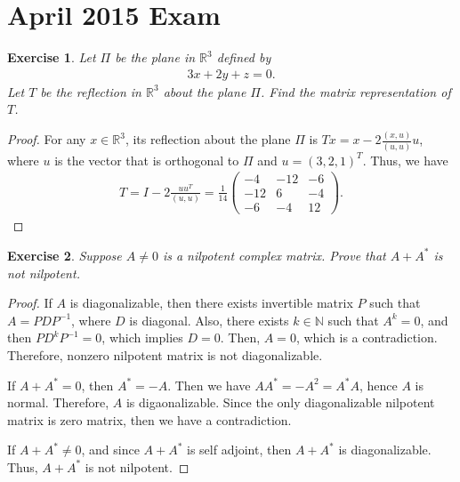 \documentclass[11pt]{article}
\newtheorem{exercise}{Exercise}[section]
\theoremstyle{definition}
\numberwithin{equation}{subsection}
\begin{document}
\newpage
\section{April 2015 Exam}

\begin{exercise}
Let $\Pi$ be the plane in $\mathbb{R}^3$ defined by
\begin{align*}
    3x + 2y + z = 0.
\end{align*}
Let $T$ be the reflection in $\mathbb{R}^3$ about the plane $\Pi$. Find the matrix representation of $T$.
\end{exercise}
\begin{proof}
For any $x \in \mathbb{R}^3$, its reflection about the plane $\Pi$ is $Tx = x - 2 \frac{(x, u)}{(u,u)}u$, where $u$ is the vector that is orthogonal to $\Pi$ and $u = (3, 2, 1)^T$. Thus, we have
\begin{align*}
    T = I - 2 \frac{uu^T}{(u,u)} = \frac{1}{14} \begin{pmatrix}
        -4 & -12 & -6 \\
        -12 & 6 & -4 \\
        -6 & -4 & 12
    \end{pmatrix}.
\end{align*}
\end{proof}

\medskip

\begin{exercise}{\rm *}
Suppose $A \neq 0$ is a nilpotent complex matrix. Prove that $A + A^*$ is not nilpotent.
\end{exercise}
\begin{proof}
If $A$ is diagonalizable, then there exists invertible matrix $P$ such that $A = PDP^{-1}$, where $D$ is diagonal. Also, there exists $k \in \mathbb{N}$ such that $A^k = 0$, and then $PD^kP^{-1} = 0$, which implies $D = 0$. Then, $A = 0$, which is a contradiction. Therefore, nonzero nilpotent matrix is not diagonalizable.

If $A + A^* = 0$, then $A^* = -A$. Then we have $AA^* = -A^2 = A^*A$, hence $A$ is normal. Therefore, $A$ is digaonalizable. Since the only diagonalizable nilpotent matrix is zero matrix, then we have a contradiction.

If $A + A^* \neq 0$, and since $A + A^*$ is self adjoint, then $A + A^*$ is diagonalizable. Thus, $A + A^*$ is not nilpotent.
\end{proof}

\medskip
\end{document}
